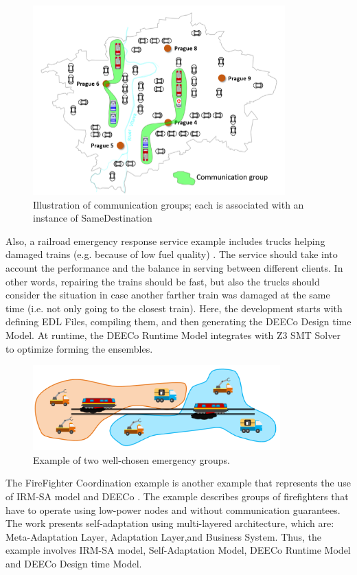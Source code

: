 \begin{figure}[!htb]
\centering
\includegraphics[scale=0.85]{figures/gossip}
\caption{Illustration of communication groups; each is associated with an instance of SameDestination}
\label{fig:gossip}
\end{figure}

Also, a railroad emergency response service example includes trucks helping damaged trains (e.g. because of low fuel quality) \cite{modelsward17}. The service should take into account the performance and the balance in serving between different clients. In other words, repairing the trains should be fast, but also the trucks should consider the situation in case another farther train was damaged at the same time (i.e. not only going to the closest train). Here, the development starts with defining EDL Files, compiling them, and then generating the DEECo Design time Model. At runtime, the DEECo Runtime Model integrates with Z3 SMT Solver to optimize forming the ensembles.

\begin{figure}[!htb]
\centering
\includegraphics[scale=0.85]{figures/trains}
\caption{Example of two well-chosen emergency groups.}
\label{fig:trains}
\end{figure}

The FireFighter Coordination example is another example that represents the use of IRM-SA model and DEECo \cite{Gerostathopoulos:2017:SAC:3068423.2823345} \cite{GEROSTATHOPOULOS2016378}. The example describes groups of firefighters that have to operate using low-power nodes and without communication guarantees. The work presents self-adaptation using multi-layered architecture, which are: Meta-Adaptation Layer, Adaptation Layer,and Business System. Thus, the example involves IRM-SA model, Self-Adaptation Model, DEECo Runtime Model and DEECo Design time Model.
 
